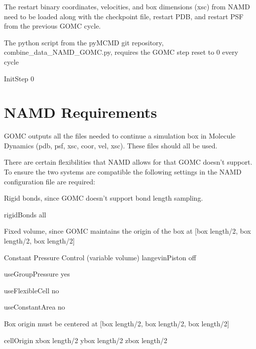 \documentclass[letterpaper,10pt,english]{sphinxmanual}
\begin{document}
\sphinxAtStartPar
The restart binary coordinates, velocities, and box dimensions (xsc) from NAMD need to be loaded along with the checkpoint file, restart PDB, and restart PSF from the previous GOMC cycle.

\sphinxAtStartPar
The python script from the py\sphinxhyphen{}MCMD git repository, combine\_data\_NAMD\_GOMC.py, requires the GOMC step reset to 0 every cycle

\begin{sphinxVerbatim}[commandchars=\\\{\}]
InitStep          0
\end{sphinxVerbatim}


\section{NAMD Requirements}
\label{\detokenize{hybrid_MC_MD:namd-requirements}}
\sphinxAtStartPar
GOMC outputs all the files needed to continue a simulation box in Molecule Dynamics (pdb, psf, xsc, coor, vel, xsc).  These files should all be used.

\sphinxAtStartPar
There are certain flexibilities that NAMD allows for that GOMC doesn’t support.  To ensure the two systems are compatible the following settings in the NAMD configuration file are required:

\sphinxAtStartPar
Rigid bonds, since GOMC doesn’t support bond length sampling.

\begin{sphinxVerbatim}[commandchars=\\\{\}]
rigidBonds          all
\end{sphinxVerbatim}

\sphinxAtStartPar
Fixed volume, since GOMC maintains the origin of the box at {[}box length/2, box length/2, box length/2{]}

\begin{sphinxVerbatim}[commandchars=\\\{\}]
\PYGZsh{} Constant Pressure Control (variable volume)
langevinPiston        off

useGroupPressure      yes

useFlexibleCell       no

useConstantArea       no
\end{sphinxVerbatim}

\sphinxAtStartPar
Box origin must be centered at {[}box length/2, box length/2, box length/2{]}

\begin{sphinxVerbatim}[commandchars=\\\{\}]
cellOrigin        x\PYGZus{}box length/2      y\PYGZus{}box length/2          z\PYGZus{}box length/2
\end{sphinxVerbatim}
\end{document}

